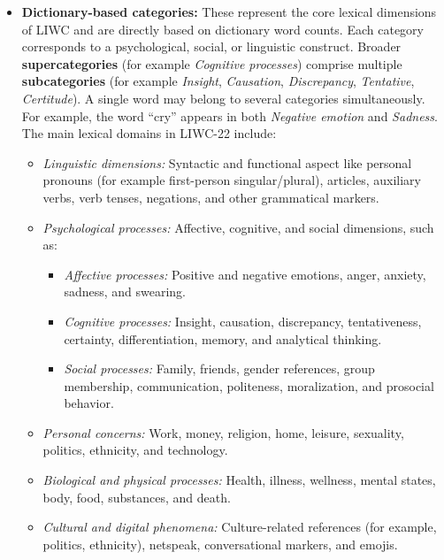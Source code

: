 \begin{itemize}
    \item \textbf{Dictionary-based categories:} These represent the core lexical dimensions of LIWC and are directly based on dictionary word counts. Each category corresponds to a psychological, social, or linguistic construct. Broader \textbf{supercategories} (for example \textit{Cognitive processes}) comprise multiple \textbf{subcategories} (for example \textit{Insight}, \textit{Causation}, \textit{Discrepancy}, \textit{Tentative}, \textit{Certitude}). A single word may belong to several categories simultaneously. For example, the word “cry” appears in both \textit{Negative emotion} and \textit{Sadness}. The main lexical domains in LIWC-22 include:
        \begin{itemize}
            \item \textit{Linguistic dimensions:} Syntactic and functional aspect like personal pronouns (for example first-person singular/plural), articles, auxiliary verbs, verb tenses, negations, and other grammatical markers.
            \item \textit{Psychological processes:} Affective, cognitive, and social dimensions, such as:
                \begin{itemize}
                    \item \textit{Affective processes:} Positive and negative emotions, anger, anxiety, sadness, and swearing.
                    \item \textit{Cognitive processes:} Insight, causation, discrepancy, tentativeness, certainty, differentiation, memory, and analytical thinking.
                    \item \textit{Social processes:} Family, friends, gender references, group membership, communication, politeness, moralization, and prosocial behavior.
                \end{itemize}
            \item \textit{Personal concerns:} Work, money, religion, home, leisure, sexuality, politics, ethnicity, and technology.
            \item \textit{Biological and physical processes:} Health, illness, wellness, mental states, body, food, substances, and death.
            \item \textit{Cultural and digital phenomena:} Culture-related references (for example, politics, ethnicity), netspeak, conversational markers, and emojis.
        \end{itemize}


\end{itemize}
